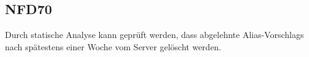 \subsection*{NFD70}
Durch \gls{statische Analyse} kann geprüft werden, dass abgelehnte \Glspl{Alias-Vorschlag} nach spätestens einer Woche vom \Gls{Server} gelöscht werden.